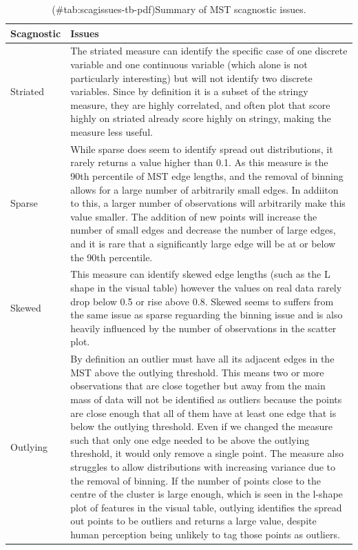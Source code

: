 \begin{Schunk}
\begin{table}

\caption{(\#tab:scagissues-tb-pdf)Summary of MST scagnostic issues.}
\centering
\begin{tabular}[t]{>{\raggedright\arraybackslash}p{3cm}l}
\toprule
Scagnostic & Issues\\
\midrule
Striated & The striated measure can identify the specific case of one discrete variable and one continuous variable (which alone is not particularly interesting) but will not identify two discrete variables. Since by definition it is a subset of the stringy measure, they are highly correlated, and often plot that score highly on striated already score highly on stringy, making the measure less useful.\\
Sparse & While sparse does seem to identify spread out distributions, it rarely returns a value higher than 0.1. As this measure is the 90th percentile of MST edge lengths, and the removal of binning allows for a large number of arbitrarily small edges. In addiiton to this, a larger number of observations will arbitrarily make this value smaller. The addition of new points will increase the number of small edges and decrease the number of large edges, and it is rare that a significantly large edge will be at or below the 90th percentile.\\
Skewed & This measure can identify skewed edge lengths (such as the L shape in the visual table) however the values on real data rarely drop below 0.5 or rise above 0.8. Skewed seems to suffers from the same issue as sparse reguarding the binning issue and is also heavily influenced by the number of observations in the scatter plot.\\
Outlying & By definition an outlier must have all its adjacent edges in the MST above the outlying threshold. This means two or more observations that are close together but away from the main mass of data will not be identified as outliers because the points are close enough that all of them have at least one edge that is below the outlying threshold. Even if we changed the measure such that only one edge needed to be above the outlying threshold, it would only remove a single point. The measure also struggles to allow distributions with increasing variance due to the removal of binning. If the number of points close to the centre of the cluster is large enough, which is seen in the l-shape plot of features in the visual table, outlying identifies the spread out points to be outliers and returns a large value, despite human perception being unlikely to tag those points as outliers.\\

\end{tabular}
\end{table}
\end{Schunk}
